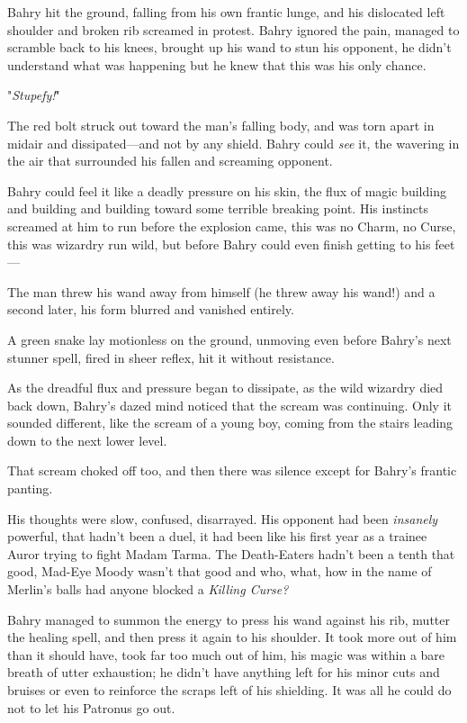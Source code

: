 Bahry hit the ground, falling from his own frantic lunge, and his dislocated
left shoulder and broken rib screamed in protest. Bahry ignored the pain,
managed to scramble back to his knees, brought up his wand to stun his
opponent, he didn't understand what was happening but he knew that this was his
only chance.

"\emph{Stupefy!}"

The red bolt struck out toward the man's falling body, and was torn apart in
midair and dissipated---and not by any shield. Bahry could \emph{see} it, the
wavering in the air that surrounded his fallen and screaming opponent.

Bahry could feel it like a deadly pressure on his skin, the flux of magic
building and building and building toward some terrible breaking point. His
instincts screamed at him to run before the explosion came, this was no Charm,
no Curse, this was wizardry run wild, but before Bahry could even finish
getting to his feet---

The man threw his wand away from himself (he threw away his wand!) and a second
later, his form blurred and vanished entirely.

A green snake lay motionless on the ground, unmoving even before Bahry's next
stunner spell, fired in sheer reflex, hit it without resistance.

As the dreadful flux and pressure began to dissipate, as the wild wizardry died
back down, Bahry's dazed mind noticed that the scream was continuing. Only it
sounded different, like the scream of a young boy, coming from the stairs
leading down to the next lower level.

That scream choked off too, and then there was silence except for Bahry's
frantic panting.

His thoughts were slow, confused, disarrayed. His opponent had been
\emph{insanely} powerful, that hadn't been a duel, it had been like his first
year as a trainee Auror trying to fight Madam Tarma. The Death-Eaters hadn't
been a tenth that good, Mad-Eye Moody wasn't that good{\el} and who, what,
how in the name of Merlin's balls had anyone blocked a \emph{Killing Curse?}

Bahry managed to summon the energy to press his wand against his rib, mutter
the healing spell, and then press it again to his shoulder. It took more out of
him than it should have, took far too much out of him, his magic was within a
bare breath of utter exhaustion; he didn't have anything left for his minor
cuts and bruises or even to reinforce the scraps left of his shielding. It was
all he could do not to let his Patronus go out.

